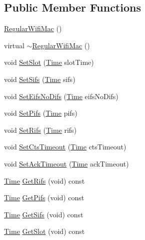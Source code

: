 \subsection*{Public Member Functions}
\begin{DoxyCompactItemize}
\item 
\hyperlink{classns3_1_1RegularWifiMac_a56bc0e2b8ecde6fc50e6f8921ce64957}{Regular\+Wifi\+Mac} ()
\item 
virtual \hyperlink{classns3_1_1RegularWifiMac_a9410af62f665a64466cbcdf10c31a20e}{$\sim$\+Regular\+Wifi\+Mac} ()
\item 
void \hyperlink{classns3_1_1RegularWifiMac_a71241af3585e17c102e51576f19a49b9}{Set\+Slot} (\hyperlink{classns3_1_1Time}{Time} slot\+Time)
\item 
void \hyperlink{classns3_1_1RegularWifiMac_a0124b9a7e6a832776603aab7685513ee}{Set\+Sifs} (\hyperlink{classns3_1_1Time}{Time} sifs)
\item 
void \hyperlink{classns3_1_1RegularWifiMac_ae7164a35bf12e8911d68aafde6005d90}{Set\+Eifs\+No\+Difs} (\hyperlink{classns3_1_1Time}{Time} eifs\+No\+Difs)
\item 
void \hyperlink{classns3_1_1RegularWifiMac_a82251725851ce71fe30aa4dae787c34a}{Set\+Pifs} (\hyperlink{classns3_1_1Time}{Time} pifs)
\item 
void \hyperlink{classns3_1_1RegularWifiMac_a38f4dd7760027ab0e921319d61befb25}{Set\+Rifs} (\hyperlink{classns3_1_1Time}{Time} rifs)
\item 
void \hyperlink{classns3_1_1RegularWifiMac_a7ef4d4275e01e09aec09b853dc4c3fa3}{Set\+Cts\+Timeout} (\hyperlink{classns3_1_1Time}{Time} cts\+Timeout)
\item 
void \hyperlink{classns3_1_1RegularWifiMac_a579903cb98f9f862aff5a179055f02ff}{Set\+Ack\+Timeout} (\hyperlink{classns3_1_1Time}{Time} ack\+Timeout)
\item 
\hyperlink{classns3_1_1Time}{Time} \hyperlink{classns3_1_1RegularWifiMac_a2071299bd1fa674249c2ae7ddd9e5839}{Get\+Rifs} (void) const 
\item 
\hyperlink{classns3_1_1Time}{Time} \hyperlink{classns3_1_1RegularWifiMac_a77862a41aefae98ea7187861d593e5c6}{Get\+Pifs} (void) const 
\item 
\hyperlink{classns3_1_1Time}{Time} \hyperlink{classns3_1_1RegularWifiMac_a77669b19ff8df8aabf0185f63b031bdb}{Get\+Sifs} (void) const 
\item 
\hyperlink{classns3_1_1Time}{Time} \hyperlink{classns3_1_1RegularWifiMac_a82420e912c4aed7c3b68fdffa7885ba1}{Get\+Slot} (void) const 
\item 

\end{DoxyCompactItemize}
